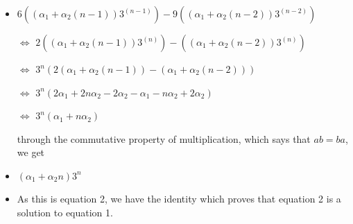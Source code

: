 \begin{enumerate}
\begin{itemize}
  \item $6((\alpha_{1}+\alpha_{2}(n-1))3^{(n-1)}) -9((\alpha_{1}+\alpha_{2}(n-2))3^{(n-2)})$
  \item [$\Leftrightarrow$]$2((\alpha_{1}+\alpha_{2}(n-1))3^{(n)}) -((\alpha_{1}+\alpha_{2}(n-2))3^{(n)})$
  \item [$\Leftrightarrow$]$3^{n}(2(\alpha_{1}+\alpha_{2}(n-1)) -(\alpha_{1}+\alpha_{2}(n-2)))$
  \item [$\Leftrightarrow$]$3^{n}(2\alpha_{1}+2n\alpha_{2}-2\alpha_{2} -\alpha_{1}-n\alpha_{2}+2\alpha_{2})$
  \item [$\Leftrightarrow$]$3^{n}(\alpha_{1}+n\alpha_{2})$
  \item [] through the commutative property of multiplication, which says that $ab=ba$, we get
  \item $(\alpha_{1}+\alpha_{2}n)3^{n}$
  \item As this is equation 2, we have the identity which proves that equation 2 is a solution to equation 1.
  \end{itemize}


\end{enumerate}

